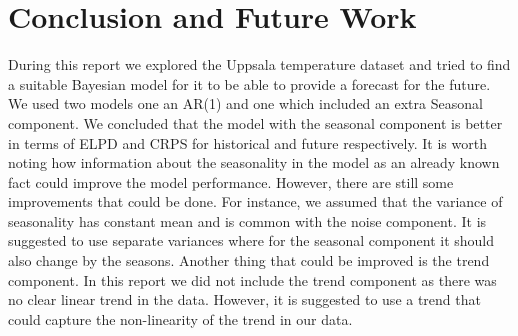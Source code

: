 \documentclass{IEEEtran}
\begin{document}
\section{Conclusion and Future Work}
During this report we explored the Uppsala temperature dataset and tried to find a suitable Bayesian model for it to be able to provide a forecast for the future. We used two models one an AR(1) and one which included an extra Seasonal component. We concluded that the model with the seasonal component is better in terms of ELPD and CRPS for historical and future respectively. It is worth noting how information about the seasonality in the model as an already known fact could improve the model performance. However, there are still some improvements that could be done. For instance, we assumed that the variance of seasonality has constant mean and is common with the noise component. It is suggested to use separate variances where for the seasonal component it should also change by the seasons. Another thing that could be improved is the trend component. In this report we did not include the trend component as there was no clear linear trend in the data. However, it is suggested to use a trend that could capture the non-linearity of the trend in our data.

  \  
    

    
\end{document}
